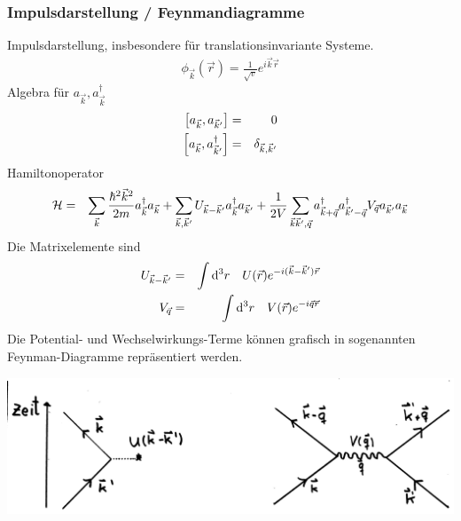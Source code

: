 \subsubsection{Impulsdarstellung / Feynmandiagramme}
Impulsdarstellung, insbesondere für translationsinvariante Systeme.
\begin{eqnarray*}
\phi_{\vec k} (\vec r) = \frac 1 {\sqrt v} e^{i \vec k\vec r}
\end{eqnarray*}
Algebra für $a_{\vec k},a^\dagger_{\vec k}$
\begin{eqnarray*}
\left [ a_{\vec k}, a_{\vec k'}\right ] &=& 0\\
\left [ a_{\vec k}, a_{\vec k'}^\dagger\right ] &=& \delta_{\vec k,\vec k'}\\
\end{eqnarray*}
Hamiltonoperator
\begin{eqnarray*}
\mathcal H &=& \sum \limits_{\vec k} \frac{\hbar^2\vec k^2}{2 m} a^\dagger_{\vec k} a_{\vec k} + \sum \limits_{\vec k,\vec k'} U_{\vec k-\vec k'}a_{\vec k}^\dagger a_{\vec k'} + \frac 1 {2V} \sum \limits_{\vec k\vec k',\vec q} a_{\vec k+\vec q}^\dagger a_{\vec k'-\vec q}^\dagger V_{ \vec q} a_{\vec k'}a_{\vec k}
\end{eqnarray*}
Die Matrixelemente sind
\begin{eqnarray*}
U_{\vec k-\vec k'} &=& \int \mathrm{d}^3r\quad U(\vec r) e^{-i(\vec k-\vec k') \vec r}\\
V_{\vec q} &=& \int \mathrm{d}^3r\quad V(\vec r) e^{-i\vec q \vec r} 
\end{eqnarray*}
Die Potential- und Wechselwirkungs-Terme können grafisch in sogenannten Feynman-Diagramme repräsentiert werden.
\begin{center}
	\includegraphics[scale=0.10]{Figs/Pim000113.png}
\end{center}

